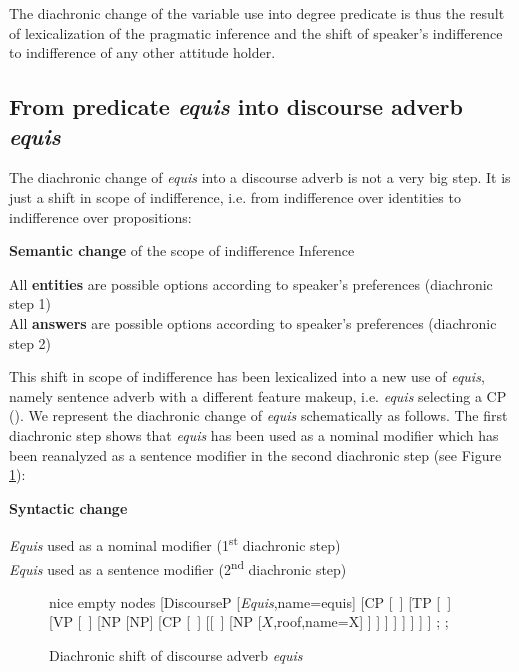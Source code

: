 \documentclass[output=paper]{langsci/langscibook}
\begin{document}
The diachronic change of the variable use into degree predicate is thus the result of lexicalization of the pragmatic inference and the shift of speaker’s indifference to indifference of any other attitude holder.


\subsection{From predicate \textit{equis} into discourse adverb \textit{equis}}\label{sec:kellert:4.2}
The diachronic change of \textit{equis} into a discourse adverb is not a very big step. It is just a shift in scope of indifference, i.e. from indifference over identities to indifference over propositions:

\ea \textbf{Semantic change} of the scope of indifference Inference\\
\begin{xlist}
 All \textbf{entities} are possible options according to speaker’s preferences (diachronic step 1)\\
 All \textbf{answers} are possible options according to speaker’s preferences (diachronic step 2)
\end{xlist}
\z

This shift in scope of indifference has been lexicalized into a new use of \textit{equis}, namely sentence adverb with a different feature makeup, i.e. \textit{equis} selecting a CP (). We represent the diachronic change of \textit{equis} schematically as follows. The first diachronic step shows that \textit{equis} has been used as a nominal modifier which has been reanalyzed as a sentence modifier in the second diachronic step (see Figure \ref{fig:kellert:tree4n}):

\ea \textbf{Syntactic change}\\
\begin{xlist}
	\textit{Equis} used as a nominal modifier (1\textsuperscript{st} diachronic step)\\
	\textit{Equis} used as a sentence modifier (2\textsuperscript{nd} diachronic step)\\
\end{xlist}
\z

\begin{figure}
	\caption{Diachronic shift of discourse adverb \textit{equis}\label{fig:kellert:tree4n}}
	\begin{forest} nice empty nodes
	[DiscourseP
	[\textit{Equis},name=equis] [CP
	[~] [TP
	[~] [VP
	[~] [NP
	[NP] [CP
	[~] [[~] [NP
	[$X$,roof,name=X]
	]
	]
	]
	]
	]
	]
	]
	]
	;
	;
\end{forest}
\end{figure}
\end{document}
